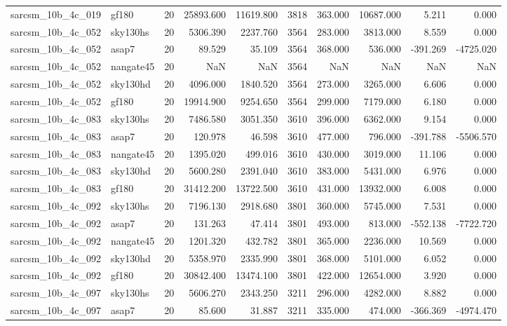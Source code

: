 \begin{longtable}{llrrrrrrrr}
sarcsm\_10b\_4c\_019 & gf180 & 20 & 25893.600 & 11619.800 & 3818 & 363.000 & 10687.000 & 5.211 & 0.000 \\
sarcsm\_10b\_4c\_052 & sky130hs & 20 & 5306.390 & 2237.760 & 3564 & 283.000 & 3813.000 & 8.559 & 0.000 \\
sarcsm\_10b\_4c\_052 & asap7 & 20 & 89.529 & 35.109 & 3564 & 368.000 & 536.000 & -391.269 & -4725.020 \\
sarcsm\_10b\_4c\_052 & nangate45 & 20 & NaN & NaN & 3564 & NaN & NaN & NaN & NaN \\
sarcsm\_10b\_4c\_052 & sky130hd & 20 & 4096.000 & 1840.520 & 3564 & 273.000 & 3265.000 & 6.606 & 0.000 \\
sarcsm\_10b\_4c\_052 & gf180 & 20 & 19914.900 & 9254.650 & 3564 & 299.000 & 7179.000 & 6.180 & 0.000 \\
sarcsm\_10b\_4c\_083 & sky130hs & 20 & 7486.580 & 3051.350 & 3610 & 396.000 & 6362.000 & 9.154 & 0.000 \\
sarcsm\_10b\_4c\_083 & asap7 & 20 & 120.978 & 46.598 & 3610 & 477.000 & 796.000 & -391.788 & -5506.570 \\
sarcsm\_10b\_4c\_083 & nangate45 & 20 & 1395.020 & 499.016 & 3610 & 430.000 & 3019.000 & 11.106 & 0.000 \\
sarcsm\_10b\_4c\_083 & sky130hd & 20 & 5600.280 & 2391.040 & 3610 & 383.000 & 5431.000 & 6.976 & 0.000 \\
sarcsm\_10b\_4c\_083 & gf180 & 20 & 31412.200 & 13722.500 & 3610 & 431.000 & 13932.000 & 6.008 & 0.000 \\
sarcsm\_10b\_4c\_092 & sky130hs & 20 & 7196.130 & 2918.680 & 3801 & 360.000 & 5745.000 & 7.531 & 0.000 \\
sarcsm\_10b\_4c\_092 & asap7 & 20 & 131.263 & 47.414 & 3801 & 493.000 & 813.000 & -552.138 & -7722.720 \\
sarcsm\_10b\_4c\_092 & nangate45 & 20 & 1201.320 & 432.782 & 3801 & 365.000 & 2236.000 & 10.569 & 0.000 \\
sarcsm\_10b\_4c\_092 & sky130hd & 20 & 5358.970 & 2335.990 & 3801 & 368.000 & 5101.000 & 6.052 & 0.000 \\
sarcsm\_10b\_4c\_092 & gf180 & 20 & 30842.400 & 13474.100 & 3801 & 422.000 & 12654.000 & 3.920 & 0.000 \\
sarcsm\_10b\_4c\_097 & sky130hs & 20 & 5606.270 & 2343.250 & 3211 & 296.000 & 4282.000 & 8.882 & 0.000 \\
sarcsm\_10b\_4c\_097 & asap7 & 20 & 85.600 & 31.887 & 3211 & 335.000 & 474.000 & -366.369 & -4974.470 \\

\end{longtable}
